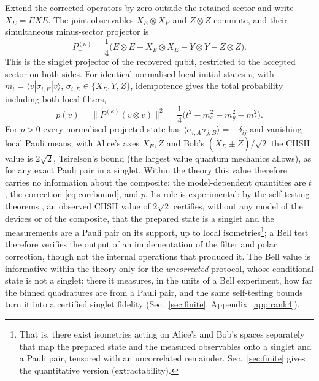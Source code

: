 \documentclass[11pt,a4paper]{article}
\newcommand{\ket}[1]{|#1\rangle}
\newcommand{\bra}[1]{\langle#1|}
\newcommand{\Zt}{\widetilde Z}
\newcommand{\Yt}{\widetilde Y}
\begin{document}
Extend the corrected operators by zero outside the retained sector and write $X_E=EXE$. The joint observables $X_E\otimes X_E$ and $\Zt\otimes\Zt$ commute, and their simultaneous minus-sector projector is
\begin{equation}
P_-^{(\kappa)}=\frac14\big(E\otimes E-X_E\otimes X_E-\Yt\otimes\Yt-\Zt\otimes\Zt\big).
\label{eq:Pminus}
\end{equation}
This is the singlet projector of the recovered qubit, restricted to the accepted sector on both sides. For identical normalised local initial states $v$, with $m_i=\bra v\sigma_{i,E}\ket v$, $\sigma_{i,E}\in\{X_E,\Yt,\Zt\}$, idempotence gives the total probability including both local filters,
\begin{equation}
p(v)=\big\|P_-^{(\kappa)}(v\otimes v)\big\|^2=\frac14\big(t^2-m_x^2-m_y^2-m_z^2\big).
\label{eq:pv}
\end{equation}
For $p>0$ every normalised projected state has $\langle\sigma_{i,A}\sigma_{j,B}\rangle=-\delta_{ij}$ and vanishing local Pauli means; with Alice's axes $X_E,\Zt$ and Bob's $(X_E\pm\Zt)/\sqrt2$ the CHSH value \cite{CHSH1969} is $2\sqrt2$, Tsirelson's bound \cite{Cirelson1980} (the largest value quantum mechanics allows), as for any exact Pauli pair in a singlet. Within the theory this value therefore carries no information about the composite; the model-dependent quantities are $t$, the correction \eqref{eq:corrbound}, and $p$. Its role is experimental: by the self-testing theorems \cite{Kaniewski2016,Supic2020}, an observed CHSH value of $2\sqrt2$ certifies, without any model of the devices or of the composite, that the prepared state is a singlet and the measurements are a Pauli pair on its support, up to local isometries\footnote{That is, there exist isometries acting on Alice's and Bob's spaces separately that map the prepared state and the measured observables onto a singlet and a Pauli pair, tensored with an uncorrelated remainder. Sec.~\ref{sec:finite} gives the quantitative version (extractability).}; a Bell test therefore verifies the output of an implementation of the filter and polar correction, though not the internal operations that produced it. The Bell value is informative within the theory only for the \emph{uncorrected} protocol, whose conditional state is not a singlet: there it measures, in the units of a Bell experiment, how far the binned quadratures are from a Pauli pair, and the same self-testing bounds turn it into a certified singlet fidelity (Sec.~\ref{sec:finite}, Appendix~\ref{app:rank4}).
\end{document}

